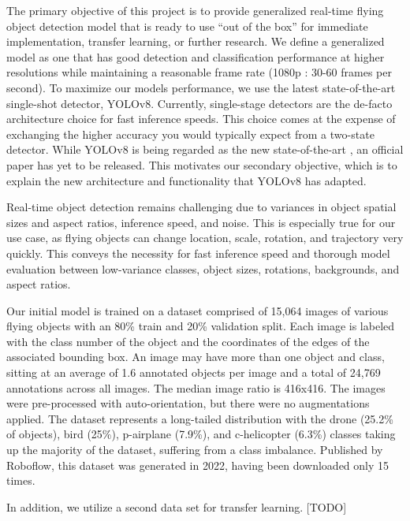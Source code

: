\documentclass[10pt,twocolumn,letterpaper]{article}
\begin{document}
The primary objective of this project is to provide generalized real-time flying object detection model that is ready to use ``out of the box'' for immediate implementation, transfer learning, or further research. We define a generalized model as one that has good detection and classification performance at higher resolutions while maintaining a reasonable frame rate (1080p : 30-60 frames per second). To maximize our models performance, we use the latest state-of-the-art single-shot detector, YOLOv8. Currently, single-stage detectors are the de-facto architecture choice for fast inference speeds. This choice comes at the expense of exchanging the higher accuracy you would typically expect from a two-state detector. While YOLOv8 is being regarded as the new state-of-the-art \cite{state-of-the-art}, an official paper has yet to be released. This motivates our secondary objective, which is to explain the new architecture and functionality that YOLOv8 has adapted. 

Real-time object detection remains challenging due to variances in object spatial sizes and aspect ratios, inference speed, and noise. This is especially true for our use case, as flying objects can change location, scale, rotation, and trajectory very quickly. This conveys the necessity for fast inference speed and thorough model evaluation between low-variance classes, object sizes, rotations, backgrounds, and aspect ratios.

Our initial model is trained on a dataset \cite{InitialDataset} comprised of 15,064 images of various flying objects with an 80\% train and 20\% validation split. Each image is labeled with the class number of the object and the coordinates of the edges of the associated bounding box. An image may have more than one object and class, sitting at an average of 1.6 annotated objects per image and a total of 24,769 annotations across all images. The median image ratio is 416x416. The images were pre-processed with auto-orientation, but there were no augmentations applied. The dataset represents a long-tailed distribution with the drone (25.2\% of objects), bird (25\%), p-airplane (7.9\%), and c-helicopter (6.3\%) classes taking up the majority of the dataset, suffering from a class imbalance. Published by Roboflow, this dataset was generated in 2022, having been downloaded only 15 times.

In addition, we utilize a second data set \cite{TransferDataset} for transfer learning. [TODO]
\end{document}
